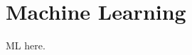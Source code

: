 \documentclass[Thesis.tex]{subfiles}
\begin{document}
\chapter{Machine Learning}
\label{chp:machine-learning}

ML here.
\end{document}
